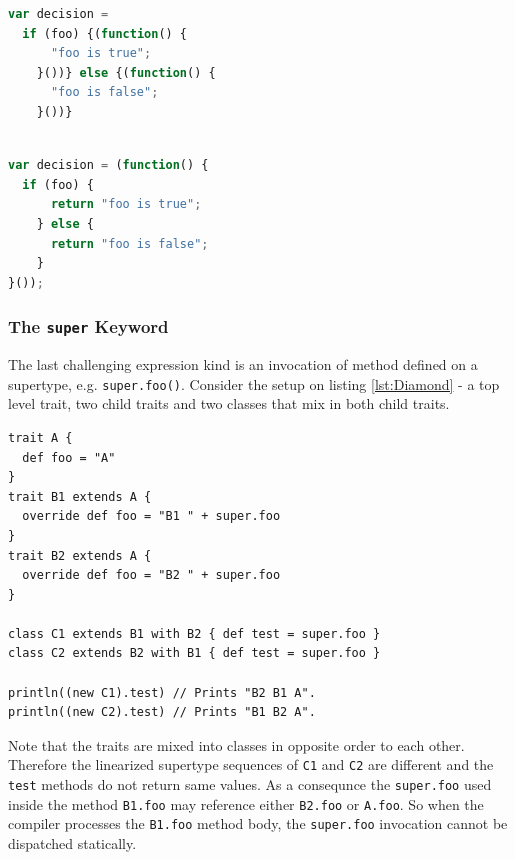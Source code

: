 \documentclass[12pt,a4paper]{report}
\begin{document}
\begin{center}
\begin{minipage}{.48\textwidth}
  \begin{lstlisting}[language=JavaScript,caption={The first step of condition compilation.},label={lst:IfReturnFirst},showlines=true]
var decision =
  if (foo) {(function() {
	  "foo is true";
	}())} else {(function() {
	  "foo is false";
	}())}
	
  \end{lstlisting}
\end{minipage}
\hfill
\begin{minipage}{.48\textwidth}
  \begin{lstlisting}[language=JavaScript,caption={The result of condition compilation.},label={lst:IfReturnFinal}]
var decision = (function() {
  if (foo) {
	  return "foo is true";
	} else {
	  return "foo is false";
	}
}());
  \end{lstlisting}
\end{minipage}
\end{center}

\subsubsection*{The \texttt{super} Keyword}

The last challenging expression kind is an invocation of method defined on a supertype, e.g. \texttt{super.foo()}. Consider the setup on listing \ref{lst:Diamond} - a top level trait, two child traits and two classes that mix in both child traits.

\begin{minipage}{\linewidth}
\begin{lstlisting}[caption={The \texttt{super} keyword non-static behavior example.},label={lst:Diamond}]
trait A { 
  def foo = "A" 
}
trait B1 extends A { 
  override def foo = "B1 " + super.foo
}
trait B2 extends A { 
  override def foo = "B2 " + super.foo
}

class C1 extends B1 with B2 { def test = super.foo }
class C2 extends B2 with B1 { def test = super.foo }

println((new C1).test) // Prints "B2 B1 A".
println((new C2).test) // Prints "B1 B2 A".
\end{lstlisting}
\end{minipage}

Note that the traits are mixed into classes in opposite order to each other. Therefore the linearized supertype sequences of \texttt{C1} and \texttt{C2} are different and the \texttt{test} methods do not return same values. As a consequnce the \texttt{super.foo} used inside the method \texttt{B1.foo} may reference either \texttt{B2.foo} or \texttt{A.foo}. So when the compiler processes the \texttt{B1.foo} method body, the \texttt{super.foo} invocation cannot be dispatched statically.
\end{document}
